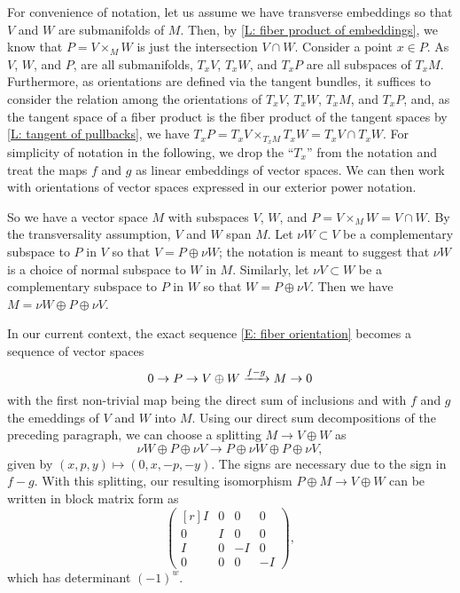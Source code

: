 For convenience of notation, let us assume we have transverse embeddings so that $V$ and $W$ are submanifolds of $M$.
Then, by \cref{L: fiber product of embeddings}, we know that $P = V \times_M W$ is just the intersection $V \cap W$.
Consider a point $x \in P$.
As $V$, $W$, and $P$, are all submanifolds, $T_xV$, $T_xW$, and $T_xP$ are all subspaces of $T_xM$. Furthermore, as orientations are defined via the tangent bundles, it suffices to consider the relation among the orientations of $T_x V$, $T_xW$, $T_xM$, and $T_xP$, and, as the tangent space of a fiber product is the fiber product of the tangent spaces by \cref{L: tangent of pullbacks}, we have $T_xP = T_xV \times_{T_xM} T_xW = T_xV \cap T_xW$.
For simplicity of notation in the following, we drop the ``$T_x$'' from the notation and treat the maps $f$ and $g$ as linear embeddings of vector spaces.
We can then work with orientations of vector spaces expressed in our exterior power notation.

So we have a vector space $M$ with subspaces $V$, $W$, and $P = V \times_M W = V \cap W$.
By the transversality assumption, $V$ and $W$ span $M$.
Let $\nu W \subset V$ be a complementary subspace to $P$ in $V$ so that $V = P \oplus \nu W$; the notation is meant to suggest that $\nu W$ is a choice of normal subspace to $W$ in $M$.
Similarly, let $\nu V \subset W$ be a complementary subspace to $P$ in $W$ so that $W = P \oplus \nu V$.
Then we have $M = \nu W \oplus P \oplus \nu V$. 

In our current context, the exact sequence \eqref{E: fiber orientation} becomes a sequence of vector spaces
\begin{equation*}
	0 \to P \to V \oplus W \xrightarrow{f-g} M \to 0
\end{equation*}
with the first non-trivial map being the direct sum of inclusions and with $f$ and $g$ the emeddings of $V$ and $W$ into $M$.
Using our direct sum decompositions of the preceding paragraph, we can choose a splitting $M \to V \oplus W$ as
\[
\nu W \oplus P \oplus \nu V \to P \oplus \nu W \oplus P \oplus \nu V,
\]
given by $(x,p,y) \mapsto (0, x, -p, -y)$.
The signs are necessary due to the sign in $f-g$.
With this splitting, our resulting isomorphism $P \oplus M \to V \oplus W$ can be written in block matrix form as
\begin{equation}\label{E: orientation matrix}
	\begin{pmatrix*}[r]
		I&0&0&0\\
		0&I&0&0\\
		I&0&-I&0\\
		0&0&0&-I
	\end{pmatrix*},
\end{equation}
which has determinant $(-1)^{w}$.

